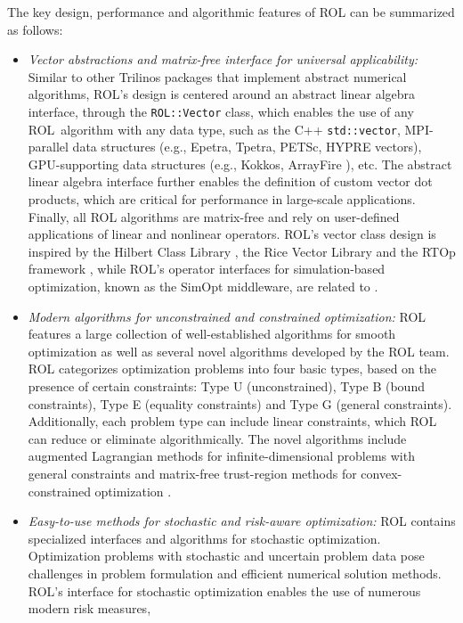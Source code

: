 The key design, performance and algorithmic features of ROL can be
summarized as follows:

\begin{itemize}
\item
\emph{Vector abstractions and matrix-free interface for universal applicability:}
Similar to other Trilinos packages that implement abstract numerical
algorithms, ROL's design is centered around an abstract linear algebra
interface, through the {\tt ROL::Vector} class, which enables the use of any
ROL~algorithm with any data type, such as the C++ {\tt std::vector}, MPI-parallel
data structures (e.g., Epetra, Tpetra, PETSc, HYPRE vectors), GPU-supporting data
structures (e.g., Kokkos, ArrayFire \cite{Yalamanchili2015}), etc.  The abstract
linear algebra interface further enables the definition of custom vector dot
products, which are critical for performance in large-scale applications.
Finally, all ROL algorithms are matrix-free and rely on user-defined
applications of linear and nonlinear operators.  ROL's vector class design is
inspired by the Hilbert Class Library \cite{hcl}, the Rice Vector Library \cite{rvl}
and the RTOp framework \cite{rtop}, while ROL's operator interfaces for
simulation-based optimization, known as the SimOpt middleware,
are related to \cite{Heinkenschloss1999}.
\item
\emph{Modern algorithms for unconstrained and constrained optimization:}
ROL features a large collection of well-established algorithms for smooth
optimization as well as several novel algorithms developed by the ROL team.
ROL categorizes optimization problems into four basic types, based on the
presence of certain constraints: Type U (unconstrained), Type B (bound
constraints), Type E (equality constraints) and Type G (general constraints).
Additionally, each problem type can include linear constraints, which ROL can
reduce or eliminate algorithmically. The novel algorithms include augmented
Lagrangian methods for infinite-dimensional problems with general constraints
\cite{ALESQP} and matrix-free trust-region methods for convex-constrained
optimization \cite{Kouri2022}.
\item
\emph{Easy-to-use methods for stochastic and risk-aware optimization:}
ROL contains specialized interfaces and algorithms for stochastic optimization.
Optimization problems with stochastic and uncertain problem data pose challenges
in problem formulation and efficient numerical solution methods.  ROL's interface
for stochastic optimization enables the use of numerous modern risk measures,

\end{itemize}
